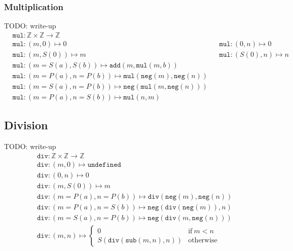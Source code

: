\documentclass{article}
\newcommand{\Z}{\mathbb{Z}}
\newcommand{\ttneg}{\mathtt{neg}}
\newcommand{\ttadd}{\mathtt{add}}
\newcommand{\ttsub}{\mathtt{sub}}
\newcommand{\ttmul}{\mathtt{mul}}
\newcommand{\ttdiv}{\mathtt{div}}
\begin{document}
\subsubsection*{Multiplication}
TODO: write-up
\begin{align*}
&{} \ttmul : \Z \times \Z \to \Z \\
&{} \ttmul : (m, 0) \mapsto 0 &
&{} \ttmul : (0, n) \mapsto 0 \\
&{} \ttmul : (m, S(0)) \mapsto m &
&{} \ttmul : (S(0), n) \mapsto n \\
&{} \ttmul : (m=S(a), S(b)) \mapsto \ttadd(m, \ttmul(m, b)) \\
&{} \ttmul : (m=P(a), n=P(b)) \mapsto \ttmul(\ttneg(m), \ttneg(n)) \\
&{} \ttmul : (m=S(a), n=P(b)) \mapsto \ttneg(\ttmul(m, \ttneg(n))) \\
&{} \ttmul : (m=P(a), n=S(b)) \mapsto \ttmul(n, m)
\end{align*}

\subsection*{Division}
TODO: write-up
\begin{align*}
&{} \ttdiv : \Z \times \Z \to \Z \\
&{} \ttdiv : (m, 0) \mapsto \mathtt{undefined} \\
&{} \ttdiv : (0, n) \mapsto 0 \\
&{} \ttdiv : (m, S(0)) \mapsto m \\
&{} \ttdiv : (m=P(a), n=P(b)) \mapsto \ttdiv(\ttneg(m), \ttneg(n)) \\
&{} \ttdiv : (m=P(a), n=S(b)) \mapsto \ttneg(\ttdiv(\ttneg(m)), n) \\
&{} \ttdiv : (m=S(a), n=P(b)) \mapsto \ttneg(\ttdiv(m, \ttneg(n))) \\
&{} \ttdiv : (m, n) \mapsto \begin{cases}
0 & \text{if} ~ m < n \\
S(\ttdiv(\ttsub(m, n), n)) & \text{otherwise}
\end{cases}
\end{align*}
\end{document}
